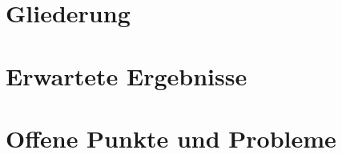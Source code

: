 \documentclass[12pt,a4paper,oneside]{article}
\begin{document}
\section{Gliederung}

\section{Erwartete Ergebnisse}

\section{Offene Punkte und Probleme}

\clearpage
\printbibliography[title={Literaturverzeichnis}]
\end{document}
